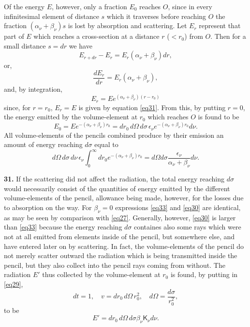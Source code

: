 \documentclass[12pt,oneside]{book}
\begin{document}
Of the energy $E$, however, only a fraction $E_0$ reaches $O$, since in every infinitesimal element of distance $s$ which it traverses before reaching $O$ the fraction $(\alpha_\nu+\beta_\nu)s$ is lost by absorption and scattering. Let $E_r$ represent that part of $E$ which reaches a cross-section at a distance $r$ ($<r_0$) from $O$. Then for a small distance $s=dr$ we have 
$$E_{r+dr}-E_r=E_r(\alpha_\nu+\beta_\nu)dr,$$
or, 
$$\frac{dE_r}{dr}=E_r(\alpha_\nu+\beta_\nu),$$
and, by integration, 
$$E_r=Ee^{(\alpha_\nu+\beta_\nu)(r-r_0)}$$
since, for $r=r_0$, $E_r=E$ is given by equation \eqref{eq31}. From this, by putting $r=0$, the energy emitted by the volume-element at $r_0$ which reaches $O$ is found to be 
\begin{equation}
    E_0=Ee^{-(\alpha_\nu+\beta_\nu)r_0}=dr_0\, d\Omega\, d\sigma\, \epsilon_\nu e^{-(\alpha_\nu+\beta_\nu)r_0}d\nu.
    \label{eq32}
\end{equation}
All volume-elements of the pencils combined produce by their emission an amount of energy reaching $d\sigma$ equal to 
\begin{equation}
    d\Omega\, d\sigma\, d\nu\, \epsilon_\nu\int_0^\infty dr_0e^{-(\alpha_\nu+\beta_\nu)r_0}=d\Omega d\sigma\frac{\epsilon_\nu}{\alpha_\nu+\beta_\nu}d\nu. 
    \label{eq33}
\end{equation} \par 

\textbf{31.} If the scattering did not affect the radiation, the total energy reaching $d\sigma$ would necessarily consist of the quantities of energy emitted by the different volume-elements of the pencil, allowance being made, however, for the losses due to absorption on the way. For $\beta_\nu=0$ expressions \eqref{eq33} and \eqref{eq30} are identical, as may be seen by comparison with \eqref{eq27}. Generally, however, \eqref{eq30} is larger than \eqref{eq33} because the energy reaching $d\sigma$ containes also some rays which were not at all emitted from elements inside of the pencil, but somewhere else, and have entered later on by scattering. In fact, the volume-elements of the pencil do not merely scatter outward the radiation which is being transmitted inside the pencil, but they also collect into the pencil rays coming from without. The radiation $E'$ thus collected by the volume-element at $r_0$ is found, by putting in \eqref{eq29},
$$dt=1,\quad v=dr_0\, d\Omega\, r_0^2, \quad d\Omega=\frac{d\sigma}{r_0^2},$$
to be 
$$E'=dr_0\, d\Omega\, d\sigma \beta_\nu\mathsf{K}_\nu d\nu.$$ \par 
\end{document}
